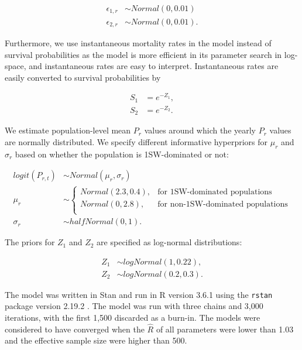 \documentclass[12pt]{article}
\newcommand{\Pg}{$P_r$\xspace}
\newcommand{\prmu}{$\mu_r$\xspace}
\newcommand{\prsig}{$\sigma_r$\xspace}
\begin{document}
\begin{align}
\epsilon_{1,r} &\sim Normal(0, 0.01) \\
\epsilon_{2,r} &\sim Normal(0, 0.01).
\end{align}

Furthermore, we use instantaneous mortality rates in the model instead of survival probabilities
as the model is more efficient in its parameter search in log-space, and instantaneous rates
are easy to interpret. Instantaneous rates are easily converted to survival probabilities by 

\begin{align}
 S_{1} &= e^{-Z_1}, \\
 S_{2} &= e^{-Z_2}. 
\end{align}

We estimate population-level mean \Pg values around which the yearly \Pg
values are normally distributed. We specify different informative hyperpriors
for \prmu and \prsig based on whether the population is 1SW-dominated or not:

\begin{align}
    logit(P_{r,t}) &\sim Normal(\mu_r, \sigma_r) \\
    \mu_r &\sim 
    \begin{cases}
       Normal(2.3, 0.4),  &\text{for 1SW-dominated populations} \\
       Normal(0, 2.8), &\text{for non-1SW-dominated populations} \\
   \end{cases} \\
    \sigma_r &\sim halfNormal(0, 1).
\end{align}

The priors for $Z_1$ and $Z_2$ are specified as log-normal distributions:

\begin{align}
Z_1 &\sim logNormal(1, 0.22),   \\ 
Z_2 &\sim logNormal(0.2, 0.3).
\end{align}

The model was written in Stan \citep{Carpenter2017} and run in R version 3.6.1
\citep{RCoreTeam2019} using the \texttt{rstan} package version 2.19.2
\citep{StanDevelopmentTeam2019}.
The model was run with three chains and 3,000 iterations, with the first 1,500
discarded as a burn-in. The models were considered to have converged when the
$\hat R$ of all parameters were lower than 1.03 and the effective sample size 
were higher than 500.
\end{document}
